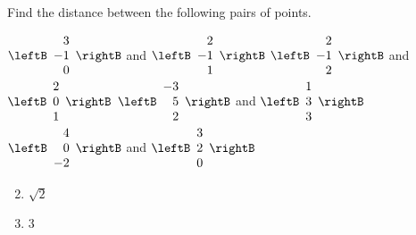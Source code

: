 \begin{multicols}{2}
\begin{ex}
Find the distance between the following pairs of points.

\begin{exenumerate}[column-sep=-15pt]
\exitem $\leftB
\begin{array}{r}
3 \\
-1 \\
0
\end{array}
\rightB$
and
$\leftB
\begin{array}{r}
2\\
-1 \\
1
\end{array}
\rightB$
\exitem $\leftB
\begin{array}{r}
2 \\
-1 \\
2
\end{array}
\rightB$
and
$\leftB
\begin{array}{r}
2\\
0 \\
1
\end{array}
\rightB$
\exitem $\leftB
\begin{array}{r}
-3 \\
5 \\
2
\end{array}
\rightB$
and
$\leftB
\begin{array}{r}
1\\
3 \\
3
\end{array}
\rightB$
\exitem $\leftB
\begin{array}{r}
4 \\
0 \\
-2
\end{array}
\rightB$
and
$\leftB
\begin{array}{r}
3\\
2 \\
0
\end{array}
\rightB$
\end{exenumerate}
\begin{sol}
\begin{enumerate}[label={\alph*.}]
\setcounter{enumi}{1}
\item 
$\sqrt{2}$

\setcounter{enumi}{3}
\item  $3$

\end{enumerate}
\end{sol}
\end{ex}


\end{multicols}
